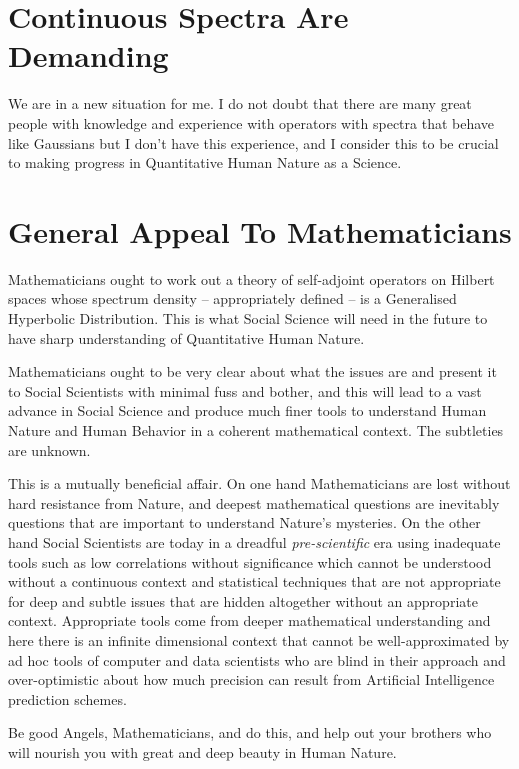 \documentclass{amsart}
\begin{document}
\section{Continuous Spectra Are Demanding}

We are in a new situation for me.  I do not doubt that there are many great people with knowledge and experience with operators with spectra that behave like Gaussians but I don't have this experience, and I consider this to be crucial to making progress in Quantitative Human Nature as a Science.

\section{General Appeal To Mathematicians}

Mathematicians ought to work out a theory of self-adjoint operators on Hilbert spaces whose spectrum density -- appropriately defined -- is a Generalised Hyperbolic Distribution.  This is what Social Science will need in the future to have sharp understanding of Quantitative Human Nature.  

Mathematicians ought to be very clear about what the issues are and present it to Social Scientists with minimal fuss and bother, and this will lead to a vast advance in Social Science and produce much finer tools to understand Human Nature and Human Behavior in a coherent mathematical context.  The subtleties are unknown.

This is a mutually beneficial affair.  On one hand Mathematicians are lost without hard resistance from Nature, and deepest mathematical questions are inevitably questions that are important to understand Nature's mysteries.  On the other hand Social Scientists are today in a dreadful {\em pre-scientific} era using inadequate tools such as low correlations without significance which cannot be understood without a continuous context and statistical techniques that are not appropriate for deep and subtle issues that are hidden altogether without an appropriate context.  Appropriate tools come from deeper mathematical understanding and here there is an infinite dimensional context that cannot be well-approximated by ad hoc tools of computer and data scientists who are blind in their approach and over-optimistic about how much precision can result from Artificial Intelligence prediction schemes.

Be good Angels, Mathematicians, and do this, and help out your brothers who will nourish you with great and deep beauty in Human Nature.
\end{document}
